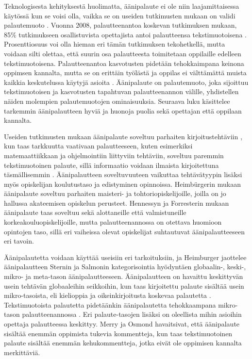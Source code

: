 \documentclass[utf8]{gradu3}
\begin{document}
Teknologisesta kehityksestä huolimatta, äänipalaute  ei ole niin laajamittaisessa käytössä kun se voisi olla, vaikka se on useiden tutkimusten mukaan on validi palautemuoto \parencite[][]{engaging}. Vuonna 2008, palautteenantoa koskevan tutkimuksen mukaan, 85\% tutkimukseen osallistuvista opettajista antoi palautteensa tekstimuotoisena \parencite[][]{electronic}. Prosenttiosuus voi olla hieman eri tämän tutkimuksen tekohetkellä, mutta voidaan silti olettaa, että suurin osa palautteesta toimitetaan oppilaille edelleen tekstimuotoisena. Palautteenantoa kasvotusten pidetään tehokkaimpana keinona oppimsen kannalta, mutta se on erittäin työlästä ja oppilas ei välttämättä muista kaikkia keskutelussa käytyjä asioita \parencite[][]{modes}. Äänipalaute on palautemuoto, joka sijoittuu tekstimuotoisen ja kasvotusten tapahtuvan palautteenannon välille, yhdistellen näiden molempien palautemuotojen ominaisuuksia. Seuraava luku käsittelee tarkemmin äänipalautteen hyviä ja huonoja puolia sekä opettajan että oppilaan kannalta.

Useiden tutkimusten mukaan äänipalaute soveltuu parhaiten kirjoitustehtäviin \parencite[][]{academics, engaging, using}, kun taas tarkkuutta vaativaan palautteeseen, kuten esimerkiksi matemaattiikkaan ja ohjelmointiin liittyviin tehtäviin, soveltuu paremmin tekstimuotoinen palaute, sillä informaatio voidaan ilmaista kirjoitettuna täsmällisemmin \parencite[][]{academics}. Äänipalautteen soveltuvuuteen vaikuttaa tehtävätyypin lisäksi myös opiskelijan koulutustaso ja edistyminen opinnoissa. Heimbürgerin \parencite[][]{using} mukaan äänipalaute soveltuu parhaiten maisteri- ja tohtoriopiskelijoille, joilla on jo hallussa akateemisen opiskelun perusteet. Hennessyn ja Forresterin \parencite[][]{developing} mukaan äänipalaute taas soveltuu sekä alottaneille että valmistuneille korkeakouluopiskelijoille, mutta palautteenannossa on otettava huomioon opintojen taso, sillä eri vaiheissa olevat opiskelijat suhtautuvat äänipalautteeseen eri tavoin.

Äänipalautetta voidaan käyttää useisiin eri tarkoituksiin, ja Heimburger \parencite[][]{using} jaottelee äänipalautteen Sternin ja Salmonin \parencite[][]{stern} kategorisointia hyödyntäen globaalin-, keski-, mikro- ja meta-tason äänipalautteeseen. Äänipalautteen on havaittu keskittyvän usein tehtävän globaaleihin seikkoihin, kun taas kirjoitettu palaute sisältää usein mikro-tasoista, eli kielioppia ja oikeinkirjoitusta koskevaa palautetta \parencite[][]{versus}. Tekstimuotoista palautetta pidetäänkin äänipalautetta tehokkaampana mikro-tason palautteenannossa \parencite[][]{ice}. Eri palaute-tasojen lisäksi on oleellista mihin asioihin opettaja palautteessa keskittyy. Merry ja Osmond \parencite[][]{attitudes} havaitsivat, että äänipalaute sisältää enemmän oppimista tukevia kommentteja, kun taas tekstimuotoinen palaute sisältää enemmän kehukommentteja, jotka eivät ole oppimisen kannalta merkittäviä.
\end{document}
